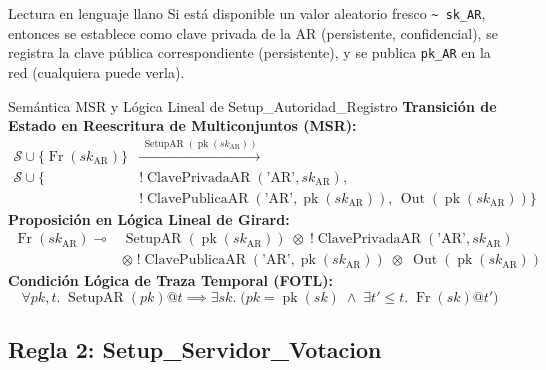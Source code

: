 \documentclass[12pt, a4paper, twoside, openright]{book}
\begin{document}
\begin{cajaDef}{Lectura en lenguaje llano}
  Si est\'a disponible un valor aleatorio fresco \texttt{\textasciitilde
  sk\_AR}, entonces se establece como clave privada de la AR
  (persistente, confidencial), se registra la clave p\'ublica
  correspondiente (persistente), y se publica \texttt{pk\_AR} en la
  red (cualquiera puede verla).
\end{cajaDef}

\begin{cajaLogica}{Sem\'antica MSR y L\'ogica Lineal de Setup\_Autoridad\_Registro}
  \textbf{Transici\'on de Estado en Reescritura de Multiconjuntos (MSR):}
  \[
    \begin{aligned}
      \mathcal{S} \cup \{ \operatorname{Fr}(\mathit{sk}_{\mathrm{AR}}) \}
      &\xrightarrow{\;\operatorname{SetupAR}(\operatorname{pk}(\mathit{sk}_{\mathrm{AR}}))\;} \\
      \mathcal{S} \cup \big\{
        &!\operatorname{ClavePrivadaAR}(\text{'AR'}, \mathit{sk}_{\mathrm{AR}}), \\
        &!\operatorname{ClavePublicaAR}(\text{'AR'}, \operatorname{pk}(\mathit{sk}_{\mathrm{AR}})),\,
        \operatorname{Out}(\operatorname{pk}(\mathit{sk}_{\mathrm{AR}}))
      \big\}
    \end{aligned}
  \]
  \textbf{Proposici\'on en L\'ogica Lineal de Girard:}
  \[
    \begin{aligned}
      \operatorname{Fr}(\mathit{sk}_{\mathrm{AR}}) \multimap
      &\operatorname{SetupAR}(\operatorname{pk}(\mathit{sk}_{\mathrm{AR}})) \;\otimes\;
      !\operatorname{ClavePrivadaAR}(\text{'AR'}, \mathit{sk}_{\mathrm{AR}}) \\
      &\otimes\; !\operatorname{ClavePublicaAR}(\text{'AR'}, \operatorname{pk}(\mathit{sk}_{\mathrm{AR}})) \;\otimes\;
      \operatorname{Out}(\operatorname{pk}(\mathit{sk}_{\mathrm{AR}}))
    \end{aligned}
  \]
  \textbf{Condici\'on L\'ogica de Traza Temporal (FOTL):}
  \[
    \forall \mathit{pk}, t.\; \operatorname{SetupAR}(\mathit{pk})@t \implies
    \exists \mathit{sk}.\; \big(\mathit{pk} = \operatorname{pk}(\mathit{sk}) \;\land\;
    \exists t' \le t.\; \operatorname{Fr}(\mathit{sk})@t'\big)
  \]
\end{cajaLogica}

\subsection{Regla 2: Setup\_Servidor\_Votacion}
\end{document}

